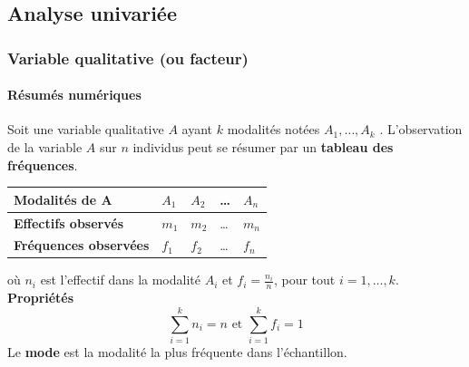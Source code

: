 \subsection{Analyse univariée}
\subsubsection{Variable qualitative (ou facteur)}
\paragraph{Résumés numériques}
Soit une variable qualitative $A$ ayant $k$ modalités notées $A_{1}, \dots , A_{k}$ . L'observation de la variable $A$ sur $n$ individus peut se résumer par un \textbf{tableau des fréquences}.

\begin{center}
\begin{tabular}{|l|l|l|l|l|}
\hline
\textbf{Modalités de A}       & $A_{1}$ & $A_{2}$ & \dots & $A_{n}$ \\ \hline
\textbf{Effectifs observés}   & $m_{1}$ & $m_{2}$ & \dots & $m_{n}$ \\ \hline
\textbf{Fréquences observées} & $f_{1}$ & $f_{2}$ & \dots  & $f_{n}$ \\ \hline
\end{tabular}
\end{center}

où $n_{i}$ est l'effectif dans la modalité $A_{i}$ et $f_{i} = \frac{n_{i}}{n}$, pour tout $i = 1,\dots,k$.\newline
\textbf{Propriétés}
$$ \sum_{i=1}^{k} n_{i} = n \textrm{ et } \sum_{i=1}^{k} f_{i} = 1$$
Le \textbf{mode} est la modalité la plus fréquente dans l'échantillon.

